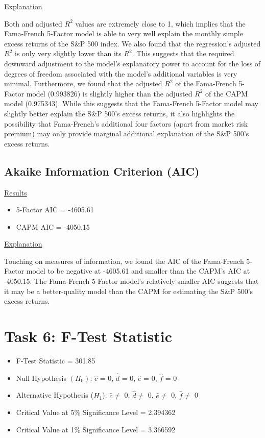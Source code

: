 \documentclass[a4paper]{article}
\begin{document}
\underline{Explanation}

Both and adjusted $R^2$ values are extremely close to 1, which implies that the Fama-French 5-Factor model is able to very well explain the monthly simple excess returns of the S\&P 500 index. 
We also found that the regression’s adjusted $R^2$ is only very slightly lower than its $R^2$. This suggests that the required downward adjustment to the model’s explanatory power to account for the loss of degrees of freedom associated with the model’s additional variables is very minimal. 
Furthermore, we found that the adjusted $R^2$ of the Fama-French 5-Factor model (0.993826) is slightly higher than the adjusted $R^2$ of the CAPM model (0.975343). While this suggests that the Fama-French 5-Factor model may slightly better explain the S\&P 500’s excess returns, it also highlights the possibility that Fama-French’s additional four factors (apart from market risk premium) may only provide marginal additional explanation of the S\&P 500’s excess returns. 

\subsection{Akaike Information Criterion (AIC)}
\underline{Results}
\begin{itemize}
	\item 5-Factor AIC = -4605.61
	\item CAPM AIC = -4050.15
\end{itemize}

\underline{Explanation}

Touching on measures of information, we found the AIC of the Fama-French 5-Factor model to be negative at -4605.61 and smaller than the CAPM’s AIC at -4050.15. The Fama-French 5-Factor model’s relatively smaller AIC suggests that it may be a better-quality model than the CAPM for estimating the S\&P 500’s excess returns. 

\newpage
\setcounter{secnumdepth}{1}
\section*{Task 6: F-Test Statistic}
\label{sec:introduction}

\begin{itemize}
	\item F-Test Statistic = 301.85
	\item Null Hypothesis $(H_0)$: $\hat{c}$ = 0, $\hat{d}$ = 0, $\hat{e}$ = 0, $\hat{f}$ = 0
	\item Alternative Hypothesis ($H_1$): $\hat{c}\ne$ 0, $\hat{d}\ne$ 0, $\hat{e} \ne$ 0, $\hat{f}\ne$ 0
	\item Critical Value at 5\% Significance Level = 2.394362
	\item Critical Value at 1\% Significance Level = 3.366592
\end{itemize}
\end{document}
